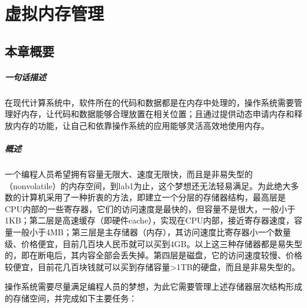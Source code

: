 \chapter{虚拟内存管理}\label{ch_vm}

\section{本章概要}

\paragraph{一句话描述}
在现代计算系统中，软件所在的代码和数据都是在内存中处理的，操作系统需要管理好内存，让代码和数据能够合理放置在相关位置；且通过提供动态申请内存和释放内存的功能，让自己和依靠操作系统的应用能够灵活高效地使用内存。


\paragraph{概述}

一个编程人员希望拥有容量无限大、速度无限快，而且是非易失型的（nonvolatile）的内存空间，到lab1为止，这个梦想还无法轻易满足。为此绝大多数的计算机采用了一种折衷的方法，即建立一个分层的存储器结构，最高层是CPU内部的一些寄存器，它们的访问速度是最快的，但容量不是很大，一般小于1KB；第二层是高速缓存（即硬件cache），实现在CPU内部，接近寄存器速度，容量一般小于4MB；第三层是主存储器（内存），其访问速度比寄存器小一个数量级、价格便宜，目前几百块人民币就可以买到4GB。以上这三种存储器都是易失型的，即在断电后，其内容全部会丢失掉。第四层是磁盘，它的访问速度较慢、价格较便宜，目前花几百块钱就可以买到存储容量\textgreater{}1TB的硬盘，而且是非易失型的。

操作系统需要尽量满足编程人员的梦想，为此它需要管理上述存储器层次结构形成的存储空间，并完成如下主要任务：

